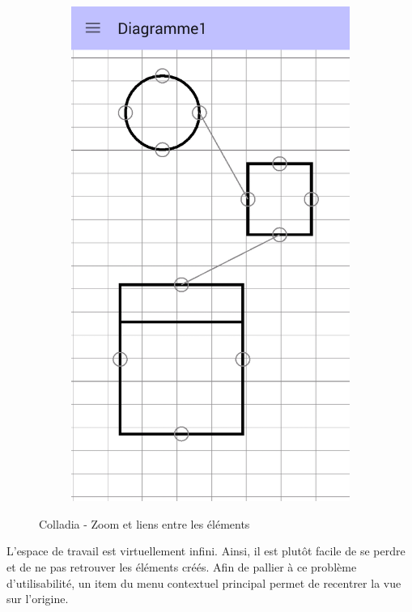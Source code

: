 \begin{figure}[!h]
\begin{subfigure}[t]{.27\textwidth}
			\end{subfigure}
			~
			\begin{subfigure}[t]{.27\textwidth}
				\includegraphics[width=\textwidth]{img/screen/new/colladia_draw_view_element_links}
			\end{subfigure}
			\caption{Colladia - Zoom et liens entre les éléments}
		\end{figure}

L'espace de travail est virtuellement infini. Ainsi, il est plutôt facile de se perdre et de ne pas retrouver les éléments créés. Afin de pallier à ce problème d'utilisabilité, un item du menu contextuel principal permet de recentrer la vue sur l'origine.

